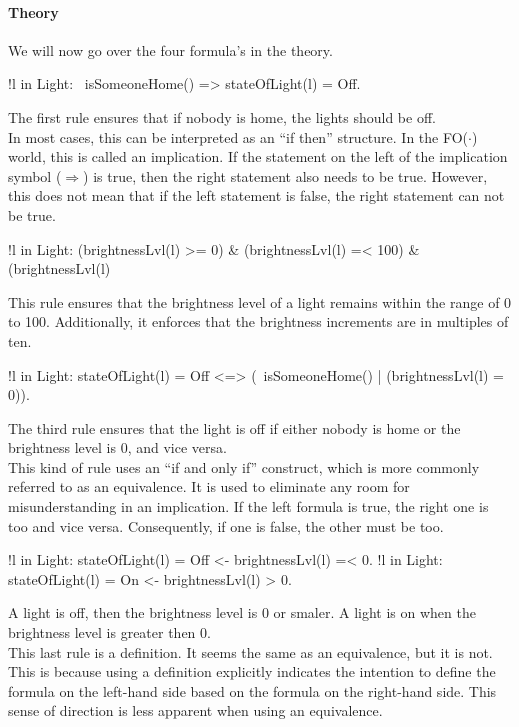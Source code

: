 \documentclass[11pt,a4paper]{report}
\newcommand{\fodot}{FO($\cdot$)\xspace}
\begin{document}
\paragraph{Theory}
We will now go over the four formula's in the theory.
\begin{idplisting}
    !l in Light: ~isSomeoneHome() => stateOfLight(l) = Off.
\end{idplisting}
The first rule ensures that if nobody is home, the lights should be off.\\
In most cases, this can be interpreted as an ``if then'' structure. In the \fodot world, this is called an implication. If the statement on the left of the implication symbol ($\Rightarrow$) is true, then the right statement also needs to be true. However, this does not mean that if the left statement is false, the right statement can not be true.
\begin{idplisting}
    !l in Light: (brightnessLvl(l) >= 0) & (brightnessLvl(l) =< 100) & (brightnessLvl(l) %
\end{idplisting}
This rule ensures that the brightness level of a light remains within the range of 0 to 100. Additionally, it enforces that the brightness increments are in multiples of ten.
\begin{idplisting}
    !l in Light: stateOfLight(l) = Off <=> (~isSomeoneHome() | (brightnessLvl(l) = 0)).
\end{idplisting}
The third rule ensures that the light is off if either nobody is home or the brightness level is 0, and vice versa.\\
This kind of rule uses an ``if and only if'' construct, which is more commonly referred to as an equivalence. It is used to eliminate any room for misunderstanding in an implication. If the left formula is true, the right one is too and vice versa. Consequently, if one is false, the other must be too.

\begin{idplisting}
    {
       !l in Light: stateOfLight(l) = Off <- brightnessLvl(l) =< 0.
       !l in Light: stateOfLight(l) = On <- brightnessLvl(l) > 0.
    }
\end{idplisting}
A light is off, then the brightness level is 0 or smaler. A light is on when the brightness level is greater then 0.\\
This last rule is a definition. It seems the same as an equivalence, but it is not. This is because using a definition explicitly indicates the intention to define the formula on the left-hand side based on the formula on the right-hand side. This sense of direction  is less apparent when using an equivalence.
\end{document}
